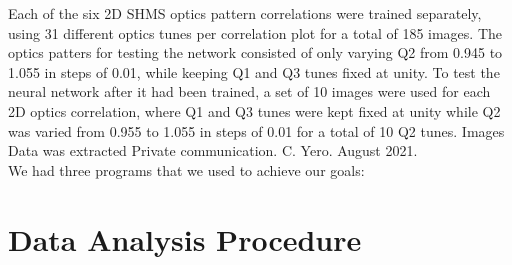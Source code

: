 \documentclass[conference]{IEEEtran}
\begin{document}
Each of the six 2D SHMS optics pattern correlations were trained separately, using 31 different optics tunes
per correlation plot for a total of 185 images. The optics patters for testing the network consisted of only
varying Q2 from 0.945 to 1.055 in steps of 0.01, while keeping Q1 and Q3 tunes fixed at unity.
To test the neural network after it had been trained, a set of 10 images were used for each 2D optics correlation, where Q1 and Q3
tunes were kept fixed at unity while Q2 was varied from 0.955 to 1.055 in steps of 0.01 for a total of 10 Q2 tunes. Images Data was extracted  \cite{PC_CY_Aug2021} Private communication. C. Yero. August 2021.\\
We had three programs that we used to achieve our goals:



\section{Data Analysis Procedure}
\end{document}
